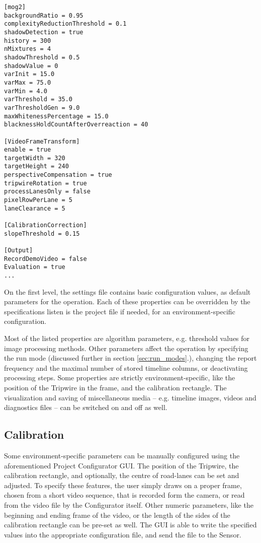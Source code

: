\begin{lstlisting}[frame=single,float=!ht,caption={Part of a configuration file. The features are organized into sections, and presented as key--value pairs.},label=lst:config_file]
[mog2]
backgroundRatio = 0.95
complexityReductionThreshold = 0.1
shadowDetection = true
history = 300
nMixtures = 4
shadowThreshold = 0.5
shadowValue = 0
varInit = 15.0
varMax = 75.0
varMin = 4.0
varThreshold = 35.0
varThresholdGen = 9.0
maxWhitenessPercentage = 15.0
blacknessHoldCountAfterOverreaction = 40

[VideoFrameTransform]
enable = true
targetWidth = 320
targetHeight = 240
perspectiveCompensation = true
tripwireRotation = true
processLanesOnly = false
pixelRowPerLane = 5
laneClearance = 5

[CalibrationCorrection]
slopeThreshold = 0.15

[Output]
RecordDemoVideo = false
Evaluation = true
...
\end{lstlisting}

On the first level, the settings file contains basic configuration values, as default parameters for the operation.
Each of these properties can be overridden by the specifications listen is the project file if needed, for an environment-specific configuration.

Most of the listed properties are algorithm parameters, e.g. threshold values for image processing methods.
Other parameters affect the operation by specifying the run mode (discussed further in section \ref{sec:run_modes}.), changing the report frequency and the maximal number of stored timeline columns, or deactivating processing steps.
Some properties are strictly environment-specific, like the position of the Tripwire in the frame, and the calibration rectangle.
The visualization and saving of miscellaneous media -- e.g. timeline images, videos and diagnostics files -- can be switched on and off as well.

\subsection{Calibration}\label{chap:calibration}
Some environment-specific parameters can be manually configured using the aforementioned Project Configurator GUI.
The position of the Tripwire, the calibration rectangle, and optionally, the centre of road-lanes can be set and adjusted.
To specify these features, the user simply draws on a proper frame, chosen from a short video sequence, that is recorded form the camera, or read from the video file by the Configurator itself.
Other numeric parameters, like the beginning and ending frame of the video, or the length of the sides of the calibration rectangle can be pre-set as well.
The GUI is able to write the specified values into the appropriate configuration file, and send the file to the Sensor. 

